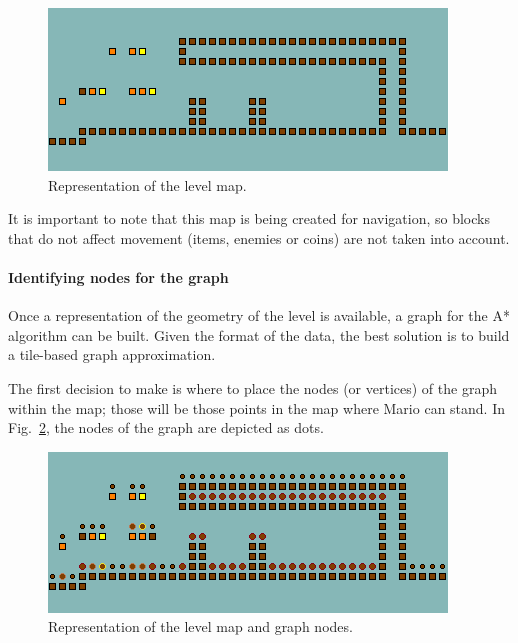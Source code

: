 \documentclass[conference]{IEEEtran}
\begin{document}
\begin{figure} [ht]
	\begin{center}
	\includegraphics[scale=0.75]{images/trapOnlyMap}
	\caption{Representation of the level map.}
	\label{fig:trapOnlyMap}
	\end{center}
\end{figure}

It is important to note that this map is being created for navigation, so
blocks that do not affect movement (items, enemies or 
coins) are not taken into account.

\paragraph{Identifying nodes for the graph}

Once a representation of the geometry of the level is available,
a graph for the A* algorithm can be built. Given the format of the data, the
best solution is to build a tile-based graph approximation.

The first decision to make is where to place the nodes (or vertices) of the graph 
within the map; those will be those points in the map where
Mario can stand. In Fig.~\ref{fig:trapNodes}, the nodes of the graph are
depicted as dots.

\begin{figure} [ht]
	\begin{center}
	\includegraphics[scale=0.75]{images/trapNodes}
	\caption{Representation of the level map and graph nodes.}
	\label{fig:trapNodes}
	\end{center}
\end{figure}
\end{document}
